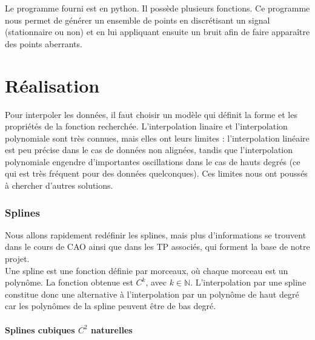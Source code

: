 \documentclass[a4paper,12pt]{article} %
\begin{document}
	    	    Le programme fourni est en python. Il possède plusieurs fonctions. Ce programme nous permet de générer un ensemble de points en discrétisant un signal (stationnaire  ou non) et en lui appliquant ensuite un bruit afin de faire apparaître des points aberrants.
	    



\renewcommand\partname{}
\part{Réalisation}
	Pour interpoler les données, il faut choisir un modèle qui définit la forme et les propriétés de la fonction recherchée. L'interpolation linaire et l'interpolation polynomiale sont très connues, mais elles ont leurs limites : l'interpolation linéaire est peu précise dans le cas de données non alignées, tandis que l'interpolation polynomiale engendre d'importantes oscillations dans le cas de hauts degrés (ce qui est très fréquent pour des données quelconques). Ces limites nous ont poussés à chercher d'autres solutions. 

	\section{Splines}
	    Nous allons rapidement redéfinir les splines, mais plus d'informations se trouvent dans le cours de CAO ainsi que dans les TP associés, qui forment la base de notre projet.\\
	    
	    
	    Une spline est une fonction définie par morceaux, où chaque morceau est un polynôme. La fonction obtenue est $C^k$, avec $k\in\mathbb{N}$. %
	    L'interpolation par une spline constitue donc une alternative à l'interpolation par un polynôme de haut degré car les polynômes de la spline peuvent être de bas degré.
		
		\subsection{\label{naturelle}Splines cubiques $C^2$ naturelles}
\end{document}
